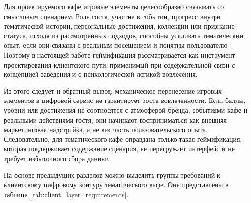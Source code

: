 Для проектируемого кафе игровые элементы целесообразно связывать со смысловым сценарием. Роль гостя, участие в событии, прогресс внутри тематической истории, персональные достижения, коллекции или признание статуса, исходя из рассмотренных подходов, способны усиливать тематический опыт, если они связаны с реальным посещением и понятны пользователю~\cite{xu2017, sutrisno2026, buil2024}. Поэтому в настоящей работе геймификация рассматривается как инструмент проектирования клиентского пути, применимый при содержательной связи с концепцией заведения и с психологической логикой вовлечения.

Из этого следует и обратный вывод: механическое перенесение игровых элементов в цифровой сервис не гарантирует роста вовлеченности. Если баллы, уровни или достижения не соотносятся с атмосферой бренда, событиями кафе и реальными действиями гостя, они начинают восприниматься как внешняя маркетинговая надстройка, а не как часть пользовательского опыта. Следовательно, для тематического кафе оправдана только такая геймификация, которая поддерживает содержание сценария, не перегружает интерфейс и не требует избыточного сбора данных.

На основе предыдущих разделов можно выделить группы требований к клиентскому цифровому контуру тематического кафе. Они представлены в таблице~\ref{tab:client_layer_requirements}.

